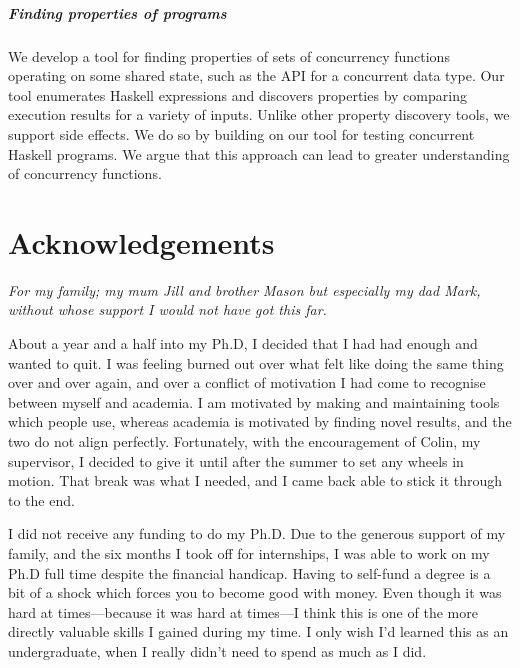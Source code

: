 \paragraph{Finding properties of programs}
We develop a tool for finding properties of sets of concurrency
functions operating on some shared state, such as the API for a
concurrent data type.  Our tool enumerates Haskell expressions and
discovers properties by comparing execution results for a variety of
inputs.  Unlike other property discovery tools, we support side
effects.  We do so by building on our tool for testing concurrent
Haskell programs.  We argue that this approach can lead to greater
understanding of concurrency functions.

\makeatletter\renewcommand{}\makeatother
\tableofcontents
\listoffigures
\listoftables
\listoflistings

\chapter*{Acknowledgements}

\begin{displayquote}\itshape
  For my family; my mum Jill and brother Mason but especially my dad
  Mark, without whose support I would not have got this far.
\end{displayquote}

\noindent
About a year and a half into my Ph.D, I decided that I had had enough
and wanted to quit.  I was feeling burned out over what felt like
doing the same thing over and over again, and over a conflict of
motivation I had come to recognise between myself and academia.  I am
motivated by making and maintaining tools which people use, whereas
academia is motivated by finding novel results, and the two do not
align perfectly.  Fortunately, with the encouragement of Colin, my
supervisor, I decided to give it until after the summer to set any
wheels in motion.  That break was what I needed, and I came back able
to stick it through to the end.

I did not receive any funding to do my Ph.D.  Due to the generous
support of my family, and the six months I took off for internships, I
was able to work on my Ph.D full time despite the financial handicap.
Having to self-fund a degree is a bit of a shock which forces you to
become good with money.  Even though it was hard at times---because it
was hard at times---I think this is one of the more directly valuable
skills I gained during my time.  I only wish I'd learned this as an
undergraduate, when I really didn't need to spend as much as I did.

